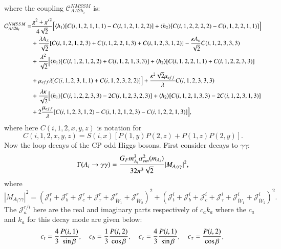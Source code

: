\documentclass[final,3p,times,pdflatex]{elsarticle}
\begin{document}
where the coupling $\mathcal{C}_{AA2h_i}^{NMSSM}$ is:
\begin{equation}
\begin{aligned}
\mathcal{C}_{AA2h_i}^{NMSSM} = & {g^2 + {g'}^2 \over 4 \sqrt{2}} \Big[ \langle h_1 \rangle [C(i,1,2,1,1,1) -C(i,1,2,1,2,2)] + \langle h_2 \rangle [C(i,1,2,2,2,2) - C(i,1,2,2,1,1)] \Big] \\ & + {\lambda A_{\lambda} \over \sqrt{2}}  [ C(i,1,2,1,2,3) + C(i,1,2,2,1,3) + C(i,1,2,3,1,2)] - {\kappa A_{\kappa} \over \sqrt{2}} C(i,1,2,3,3,3) \\ & + {\lambda^2 \over \sqrt{2}} \Big [  \langle h_1 \rangle[C(i,1,2,1,2,2) + C(i,1,2,1,3,3)] + \langle h_2 \rangle [C(i,1,2,2,1,1) + C(i,1,2,2,3,3)] \\ & + \mu_{eff} \lambda [C(i,1,2,3,1,1) + C(i,1,2,3,2,2)] \Big]  + {\kappa^2 \sqrt{2} \mu_{eff} \over \lambda}C(i,1,2,3,3,3) \\ & + {\lambda \kappa \over \sqrt{2}}\Big[ \langle h_1 \rangle [C(i,1,2,2,3,3) - 2C(i,1,2,3,2,3)] + \langle h_2 \rangle [ C(i,1,2,1,3,3) - 2 C(i,1,2,3,1,3)] \\ & + 2{\mu_{eff} \over \lambda} [C(i,1,2,3,1,2)-C(i,1,2,1,2,3)-C(i,1,2,2,1,3)]\Big],
\end{aligned}
\end{equation}
where here $C(i,1,2,x,y,z)$ is notation for
\begin{equation} \label{CAA2hi}
C(i,1,2,x,y,z) = S(i,x)[P(1,y)P(2,z) + P(1,z)P(2,y)].
\end{equation}
Now the loop decays of the CP odd Higgs bosons. First consider decays to $\gamma\gamma$:
\begin{equation} \label{AgamgamNMSSM}
\Gamma(A_i \rightarrow \gamma \gamma) = {G_{F} m_{A_i}^3 \alpha_{em}^2 (m_{A_i})  \over 32 \pi^3 \sqrt{2}} |M_{A_i \gamma \gamma}|^2,
\end{equation}
where
\begin{equation}
|M_{A_i \gamma \gamma}|^2 = (\mathcal{J}_{t}^{r} + \mathcal{J}_{b}^{r} + \mathcal{J}_{c}^{r} + \mathcal{J}_{\tau}^{r} + \mathcal{J}_{\tilde{W}_1}^{r} + \mathcal{J}_{\tilde{W}_2}^{r})^2 + (\mathcal{J}_{t}^{i} + \mathcal{J}_{b}^{i} + \mathcal{J}_{c}^{i} + \mathcal{J}_{\tau}^{i} + \mathcal{J}_{\tilde{W}_1}^{i} + \mathcal{J}_{\tilde{W}_2}^{i})^2.
\end{equation}
The $\mathcal{J}_{a}^{r/i}$ here are the real and imaginary parts respectively of $c_{a}k_{a}$ where the $c_{a}$ and $k_{a}$ for this decay mode are given below:
\begin{equation}
c_{t} = {4 \over 3}{P(i,1) \over \sin\beta}, \quad \quad\\
c_{b} = {1 \over 3}{P(i,2) \over \cos\beta}, \quad \quad\\
c_{c} = {4 \over 3}{P(i,1) \over \sin\beta}, \quad \quad\\
c_{\tau} = {P(i,2) \over \cos\beta} ,\\
\end{equation}
\end{document}
